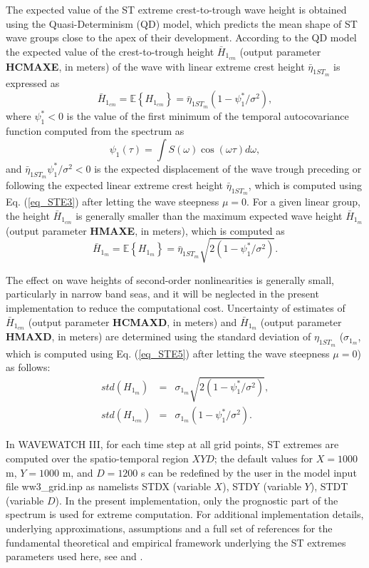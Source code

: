The expected value of the ST extreme crest-to-trough wave height is obtained using the Quasi-Determinism (QD) model, which predicts the mean shape of ST wave groups close to the apex of their development. According to the QD model the expected value of the crest-to-trough height $\bar{H}_{1_{cm}}$ (output parameter \textbf{HCMAXE}, in meters) of the wave with linear extreme crest height $\bar{\eta}_{1ST_m}$ is expressed as
\begin{equation}
\bar{H}_{1_{cm}}=\mathbb{E}\left\{H_{1_{cm}} \right\} = \bar{\eta}_{1ST_m}(1-\psi_1^* / \sigma^2),
\label{eq_STE6}
\end{equation}
where $\psi_1^* < 0$ is the value of the first minimum of the temporal autocovariance function computed from the spectrum as
\begin{equation}
\psi_1(\tau) = \int S(\omega) \cos{(\omega \tau)} d \omega,
\label{eq_STE7}
\end{equation}
and $\bar{\eta}_{1ST_m}  \psi_1^*/\sigma^2 < 0$ is the expected displacement of the wave trough preceding or following the expected linear extreme crest height $\bar{\eta}_{1ST_m}$, which is computed using Eq. (\ref{eq_STE3}) after letting the wave steepness $\mu=0$. For a given linear group, the height $\bar{H}_{1_{cm}}$ is generally smaller than the maximum expected wave height $\bar{H}_{1_m}$ (output parameter \textbf{HMAXE}, in meters), which is computed as
\begin{equation}
\bar{H}_{1_m}=\mathbb{E}\left\{H_{1_m} \right\} = \bar{\eta}_{1ST_m}\sqrt{2(1-\psi_1^* / \sigma^2)}.
\label{eq_STE8}
\end{equation}

The effect on wave heights of second-order nonlinearities is generally small, particularly in narrow band seas, and it will be neglected in the present implementation to reduce the computational cost. Uncertainty of estimates of $\bar{H}_{1_{cm}}$ (output parameter \textbf{HCMAXD}, in meters) and $\bar{H}_{1_m}$ (output parameter \textbf{HMAXD}, in meters) are determined using the standard deviation of $\eta_{1ST_m}$ ($\sigma_{1_m}$, which is computed using Eq. (\ref{eq_STE5}) after letting the wave steepness $\mu=0$) as follows:
\begin{eqnarray}
std({H}_{1_m})&=&\sigma_{1_m}\sqrt{2(1-\psi_1^* / \sigma^2)}, \nonumber \\
std({H}_{1_{cm}})&=&\sigma_{1_m}(1-\psi_1^* / \sigma^2).
\label{eq_STE9}
\end{eqnarray}

In WAVEWATCH III, for each time step at all grid points, ST extremes are computed over the spatio-temporal region $XYD$; the default values for $X = 1000$ m, $Y = 1000$ m, and $D = 1200$ s can be redefined by the user in the model input file {\file ww3\_grid.inp} as namelists {\code STDX} (variable $X$), {\code STDY} (variable $Y$), {\code STDT} (variable $D$). In the present implementation, only the prognostic part of the spectrum is used for extreme computation. For additional implementation details, underlying approximations, assumptions and a full set of references for the fundamental theoretical and empirical framework underlying the ST extremes parameters used here, see \cite{Fed12sp} and \cite{Baet16}.

